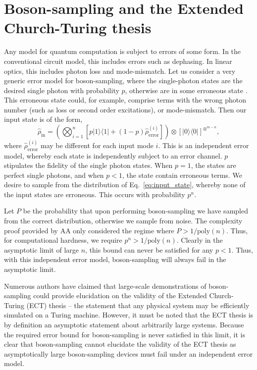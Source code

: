\documentclass[aps,pra,twocolumn,amsmath,amssymb,nofootinbib,superscriptaddress]{revtex4}
\newcommand{\bra}[1]{\langle#1|}
\newcommand{\ket}[1]{|#1\rangle}
\begin{document}
\section{Boson-sampling and the Extended Church-Turing thesis}

Any model for quantum computation is subject to errors of some form. In the conventional circuit model, this includes errors such as dephasing. In linear optics, this includes photon loss and mode-mismatch. Let us consider a very generic error model for boson-sampling, where the single-photon states are the desired single photon with probability $p$, otherwise are in some erroneous state \cite{bib:BSECT}. This erroneous state could, for example, comprise terms with the wrong photon number (such as loss or second order excitations), or mode-mismatch. Then our input state is of the form,
\begin{equation} \label{eq:error_model}
\hat\rho_\mathrm{in} =\left(\bigotimes_{i=1}^n[p\ket{1}\bra{1} + (1-p)\hat\rho_\mathrm{error}^{(i)}]\right) \otimes [\ket{0}\bra{0}]^{\otimes^{m-n}},
\end{equation}
where \mbox{$\hat\rho_\mathrm{error}^{(i)}$} may be different for each input mode $i$. This is an independent error model, whereby each state is independently subject to an error channel. $p$ stipulates the fidelity of the single photon states. When \mbox{$p=1$}, the states are perfect single photons, and when \mbox{$p<1$}, the state contain erroneous terms. We desire to sample from the distribution of Eq.~\ref{eq:input_state}, whereby none of the input states are erroneous. This occurs with probability $p^n$.

Let $P$ be the probability that upon performing boson-sampling we have sampled from the correct distribution, otherwise we sample from noise. The complexity proof provided by AA only considered the regime where \mbox{$P>1/\mathrm{poly}(n)$}. Thus, for computational hardness, we require \mbox{$p^n > 1/\mathrm{poly}(n)$}. Clearly in the asymptotic limit of large $n$, this bound can never be satisfied for any $p<1$. Thus, with this independent error model, boson-sampling will always fail in the asymptotic limit.

Numerous authors \cite{bib:Broome20122012, bib:ShenDuan13, bib:AA13response, bib:Shchesnovich13, bib:Molmer13} have claimed that large-scale demonstrations of boson-sampling could provide elucidation on the validity of the Extended Church-Turing (ECT) thesis -- the statement that any physical system may be efficiently simulated on a Turing machine. However, it must be noted that the ECT thesis is by definition an asymptotic statement about arbitrarily large systems. Because the required error bound for boson-sampling is never satisfied in this limit, it is clear that boson-sampling cannot elucidate the validity of the ECT thesis as asymptotically large boson-sampling devices must fail under an independent error model.
\end{document}
